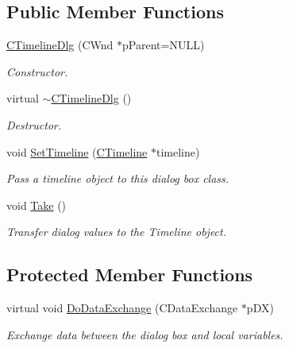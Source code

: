 \subsection*{Public Member Functions}
\begin{DoxyCompactItemize}
\item 
\hyperlink{class_c_timeline_dlg_a223084ec9e733c204098c759514ffad8}{C\+Timeline\+Dlg} (C\+Wnd $\ast$p\+Parent=N\+U\+L\+L)
\begin{DoxyCompactList}\small\item\em Constructor. \end{DoxyCompactList}\item 
\hypertarget{class_c_timeline_dlg_afd8204d07f08a1c38cf6945216ea2d25}{virtual \hyperlink{class_c_timeline_dlg_afd8204d07f08a1c38cf6945216ea2d25}{$\sim$\+C\+Timeline\+Dlg} ()}\label{class_c_timeline_dlg_afd8204d07f08a1c38cf6945216ea2d25}

\begin{DoxyCompactList}\small\item\em Destructor. \end{DoxyCompactList}\item 
void \hyperlink{class_c_timeline_dlg_a52cb094ebeb1ac40f9109a4bd98651e1}{Set\+Timeline} (\hyperlink{class_c_timeline}{C\+Timeline} $\ast$timeline)
\begin{DoxyCompactList}\small\item\em Pass a timeline object to this dialog box class. \end{DoxyCompactList}\item 
\hypertarget{class_c_timeline_dlg_a26e970d2fc1c0017d7ff3f5ab4e9092e}{void \hyperlink{class_c_timeline_dlg_a26e970d2fc1c0017d7ff3f5ab4e9092e}{Take} ()}\label{class_c_timeline_dlg_a26e970d2fc1c0017d7ff3f5ab4e9092e}

\begin{DoxyCompactList}\small\item\em Transfer dialog values to the Timeline object. \end{DoxyCompactList}\end{DoxyCompactItemize}
\subsection*{Protected Member Functions}
\begin{DoxyCompactItemize}
\item 
virtual void \hyperlink{class_c_timeline_dlg_a25237f8bfd8a868aeeb00518e86248b0}{Do\+Data\+Exchange} (C\+Data\+Exchange $\ast$p\+D\+X)
\begin{DoxyCompactList}\small\item\em Exchange data between the dialog box and local variables. \end{DoxyCompactList}\end{DoxyCompactItemize}


